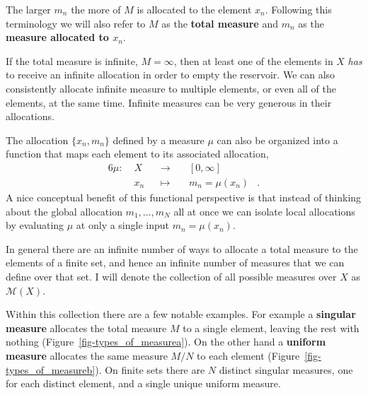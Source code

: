 \documentclass[
  letterpaper,
  DIV=11,
  numbers=noendperiod]{scrartcl}
\begin{document}
The larger \(m_{n}\) the more of \(M\) is allocated to the element
\(x_{n}\). Following this terminology we will also refer to \(M\) as the
\textbf{total measure} and \(m_{n}\) as the \textbf{measure allocated to
\(x_{n}\)}.

If the total measure is infinite, \(M = \infty\), then at least one of
the elements in \(X\) \emph{has} to receive an infinite allocation in
order to empty the reservoir. We can also consistently allocate infinite
measure to multiple elements, or even all of the elements, at the same
time. Infinite measures can be very generous in their allocations.

The allocation \(\{ x_{n}, m_{n} \}\) defined by a measure \(\mu\) can
also be organized into a function that maps each element to its
associated allocation, \begin{alignat*}{6}
\mu :\; & X & &\rightarrow& \; & [0, \infty] &
\\
& x_{n} & &\mapsto& & m_{n} = \mu(x_{n}) &.
\end{alignat*} A nice conceptual benefit of this functional perspective
is that instead of thinking about the global allocation
\(m_1, \ldots, m_N\) all at once we can isolate local allocations by
evaluating \(\mu\) at only a single input \(m_{n} = \mu(x_{n})\).

In general there are an infinite number of ways to allocate a total
measure to the elements of a finite set, and hence an infinite number of
measures that we can define over that set. I will denote the collection
of all possible measures over \(X\) as \(\mathcal{M}(X)\).

Within this collection there are a few notable examples. For example a
\textbf{singular measure} allocates the total measure \(M\) to a single
element, leaving the rest with nothing
(Figure~\ref{fig-types_of_measurea}). On the other hand a
\textbf{uniform measure} allocates the same measure \(M / N\) to each
element (Figure~\ref{fig-types_of_measureb}). On finite sets there are
\(N\) distinct singular measures, one for each distinct element, and a
single unique uniform measure.
\end{document}
